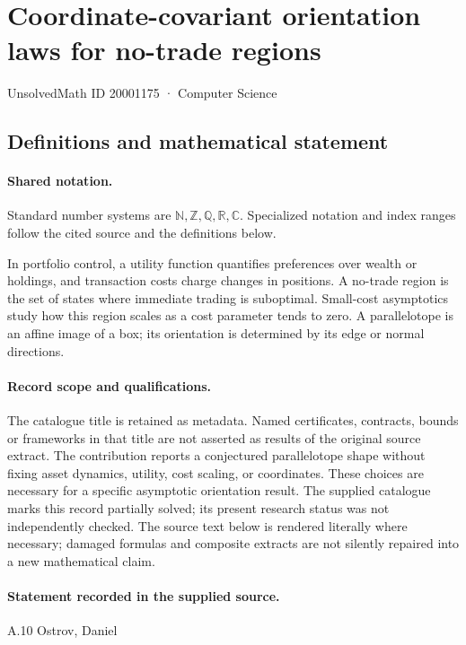 \documentclass[11pt]{article}
\begin{document}
\setcounter{section}{20001174}
\section{Coordinate-covariant orientation laws for no-trade regions}\label{20001175}
{\small\sffamily UnsolvedMath ID 20001175 · Computer Science}
\subsection{Definitions and mathematical statement}

\paragraph{Shared notation.}Standard number systems are $\mathbb N,\mathbb Z,\mathbb Q,\mathbb R,\mathbb C$. Specialized notation and index ranges follow the cited source and the definitions below.


In portfolio control, a utility function quantifies preferences over wealth or holdings, and transaction costs charge changes in positions. A no-trade region is the set of states where immediate trading is suboptimal. Small-cost asymptotics study how this region scales as a cost parameter tends to zero. A parallelotope is an affine image of a box; its orientation is determined by its edge or normal directions.
\paragraph{Record scope and qualifications.}
The catalogue title is retained as metadata. Named certificates, contracts, bounds or frameworks in that title are not asserted as results of the original source extract.
The contribution reports a conjectured parallelotope shape without fixing asset dynamics, utility, cost scaling, or coordinates. These choices are necessary for a specific asymptotic orientation result. The supplied catalogue marks this record partially solved; its present research status was not independently checked.
The source text below is rendered literally where necessary; damaged formulas and composite extracts are not silently repaired into a new mathematical claim.
\paragraph{Statement recorded in the supplied source.}
A.10 Ostrov, Daniel
\end{document}
